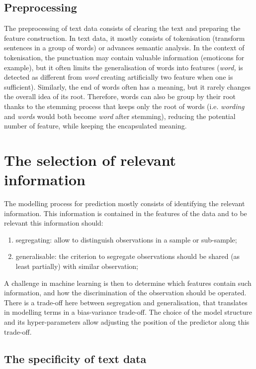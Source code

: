 \documentclass[a4paper]{tufte-handout}
\begin{document}
\begin{fullwidth}
\subsection{Preprocessing}

The preprocessing of text data consists of clearing the text and preparing the feature construction. In text data, it mostly consists of tokenisation (transform sentences in a group of words) or advances semantic analysis. In the context of tokenisation, the punctuation may contain valuable information (emoticons for example), but it often limits the generalisation of words into features (\textit{word,} is detected as different from \textit{word} creating artificially two feature when one is sufficient). Similarly, the end of words often has a meaning, but it rarely changes the overall idea of its root. Therefore, words can also be group by their root thanks to the stemming process that keeps only the root of words (i.e. \textit{wording} and \textit{words} would both become \textit{word} after stemming), reducing the potential number of feature, while keeping the encapsulated meaning.


\section{The selection of relevant information}

The modelling process for prediction mostly consists of identifying the relevant information. This information is contained in the features of the data and to be relevant this information should:
\begin{enumerate}
\item segregating: allow to distinguish observations in a sample or sub-sample;
\item generalisable: the criterion to segregate observations should be shared (as least partially) with similar observation;
\end{enumerate}
A challenge in machine learning is then to determine which features contain such information, and how the discrimination of the observation should be operated. There is a trade-off here between segregation and generalisation, that translates in modelling terms in a bias-variance trade-off. The choice of the model structure and its hyper-parameters allow adjusting the position of the predictor along this trade-off.

\subsection{The specificity of text data}


\end{fullwidth}
\end{document}
